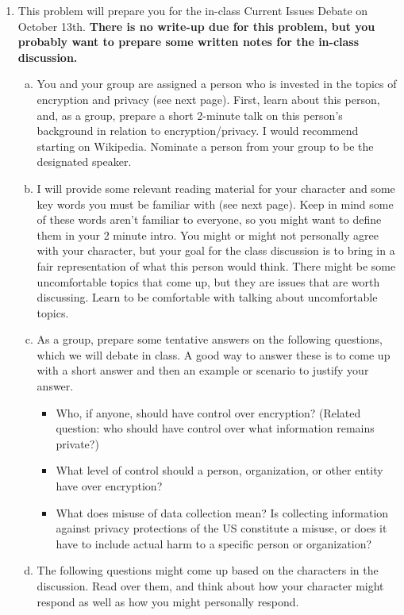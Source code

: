 \documentclass[12pt]{amsart}
\theoremstyle{plain}
\theoremstyle{definition}
\begin{document}
\begin{enumerate}[1.]
	\item This problem will prepare you for the in-class Current Issues Debate on October 13th. \textbf{There is no write-up due for this problem, but you probably want to prepare some written notes for the in-class discussion.}\\
		\begin{enumerate}[a.]
			\item You and your group are assigned a person who is invested in the topics of encryption and privacy (see next page).  First, learn about this person, and, as a group, prepare a short 2-minute talk on this person's background in relation to encryption/privacy. I would recommend starting on Wikipedia.  Nominate a person from your group to be the designated speaker.\\
			\item I will provide some relevant reading material for your character and some key words you must be familiar with (see next page).  Keep in mind some of these words aren't familiar to everyone, so you might want to define them in your 2 minute intro.  You might or might not personally agree with your character, but your goal for the class discussion is to bring in a fair representation of what this person would think.  There might be some uncomfortable topics that come up, but they are issues that are worth discussing.  Learn to be comfortable with talking about uncomfortable topics.\\
			\item As a group, prepare some tentative answers on the following questions, which we will debate in class.  A good way to answer these is to come up with a short answer and then an example or scenario to justify your answer.
				\begin{itemize}
					\item Who, if anyone, should have control over encryption? (Related question: who should have control over what information remains private?)
					\item What level of control should a person, organization, or other entity have over encryption?
					\item What does misuse of data collection mean?  Is collecting information against privacy protections of the US constitute a misuse, or does it have to include actual harm to a specific person or organization? \\
				\end{itemize}
			\item The following questions might come up based on the characters in the discussion.  Read over them, and think about how your character might respond as well as how you might personally respond. \\

\end{enumerate}
\end{enumerate}
\end{document}
